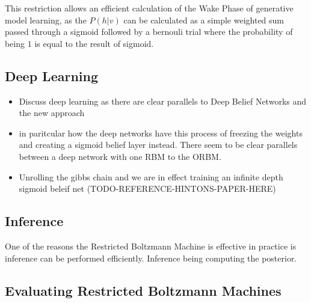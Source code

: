   This restriction allows an efficient calculation of the Wake Phase of generative model learning, as the $ P(h|v) $ can be calculated as a simple weighted sum passed through a sigmoid followed by a bernouli trial where the probability of being $1$ is equal to the result of sigmoid.



  \subsection{Deep Learning}

    \begin{itemize}
      \item Discuss deep learning as there are clear parallels to Deep Belief Networks and the new approach
      \item in paritcular how the deep networks have this process of freezing the weights and creating a sigmoid belief layer instead. There seem to be clear parallels between a deep network with one RBM to the ORBM.
    \end{itemize}

  \begin{itemize}
    \item Unrolling the gibbs chain and we are in effect training an infinite depth sigmoid beleif net (TODO-REFERENCE-HINTONS-PAPER-HERE)
  \end{itemize}

    \subsection{Inference}
    One of the reasons the Restricted Boltzmann Machine is effective in practice is inference can be performed efficiently. Inference being computing the posterior.

    \subsection{Evaluating Restricted Boltzmann Machines}

